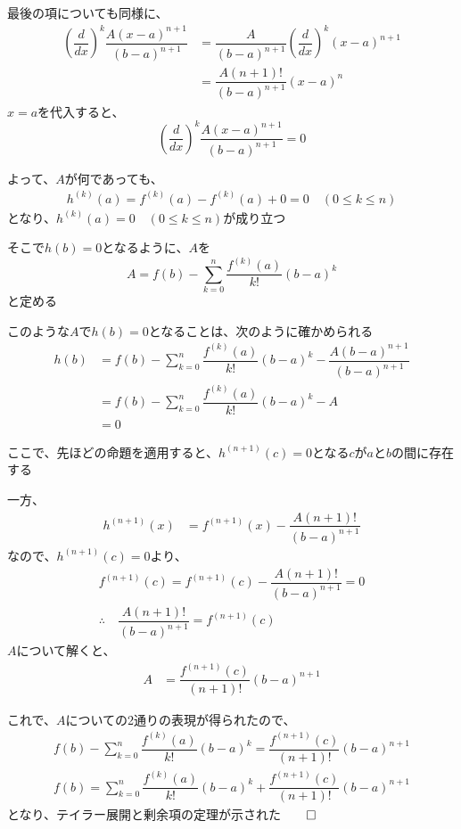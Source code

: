 \documentclass[../book_jiriki_calc]{subfiles}
\begin{document}
\br

最後の項についても同様に、
\begin{align*}
  \left(\dfrac{d}{dx}\right)^k \dfrac{A(x-a)^{n+1}}{(b-a)^{n+1}} & = \dfrac{A}{(b-a)^{n+1}}\left(\dfrac{d}{dx}\right)^k (x-a)^{n+1} \\
                                                                 & = \dfrac{A(n+1)!}{(b-a)^{n+1}}(x-a)^n
\end{align*}
$x=a$を代入すると、
\begin{equation*}
  \left(\dfrac{d}{dx}\right)^k \dfrac{A(x-a)^{n+1}}{(b-a)^{n+1}} = 0
\end{equation*}

\br

よって、$A$が何であっても、
\begin{align*}
  h^{(k)}(a) = f^{(k)}(a) - f^{(k)}(a) + 0 = 0 \quad (0 \leq k \leq n)
\end{align*}
となり、$h^{(k)}(a)=0 \quad (0\leq k \leq n)$が成り立つ

\br

そこで$h(b)=0$となるように、$A$を
\begin{equation*}
  A = f(b) - \sum_{k=0}^{n} \dfrac{f^{(k)}(a)}{k!}(b-a)^k
\end{equation*}
と定める

このような$A$で$h(b)=0$となることは、次のように確かめられる
\begin{align*}
  h(b) & = f(b) - \sum_{k=0}^{n} \dfrac{f^{(k)}(a)}{k!}(b-a)^k - \dfrac{A(b-a)^{n+1}}{(b-a)^{n+1}} \\
       & = f(b) - \sum_{k=0}^{n} \dfrac{f^{(k)}(a)}{k!}(b-a)^k - A                                 \\
       & = 0
\end{align*}

\br

ここで、先ほどの命題を適用すると、$h^{(n+1)}(c)=0$となる$c$が$a$と$b$の間に存在する

一方、
\begin{align*}
  h^{(n+1)}(x) & = f^{(n+1)}(x) - \dfrac{A(n+1)!}{(b-a)^{n+1}}
\end{align*}
なので、$h^{(n+1)}(c)=0$より、
\begin{gather}
  f^{(n+1)}(c)                                  = f^{(n+1)}(c) - \dfrac{A(n+1)!}{(b-a)^{n+1}} = 0 \\
  \therefore \quad \dfrac{A(n+1)!}{(b-a)^{n+1}} = f^{(n+1)}(c)
\end{gather}
$A$について解くと、
\begin{align*}
  A & = \dfrac{f^{(n+1)}(c)}{(n+1)!}(b-a)^{n+1}
\end{align*}

\br

これで、$A$についての2通りの表現が得られたので、
\begin{gather}
  f(b) - \sum_{k=0}^{n} \dfrac{f^{(k)}(a)}{k!}(b-a)^k = \dfrac{f^{(n+1)}(c)}{(n+1)!}(b-a)^{n+1} \\
  f(b) = \sum_{k=0}^{n} \dfrac{f^{(k)}(a)}{k!}(b-a)^k + \dfrac{f^{(n+1)}(c)}{(n+1)!}(b-a)^{n+1}
\end{gather}
となり、テイラー展開と剰余項の定理が示された$\qed$
\end{document}

